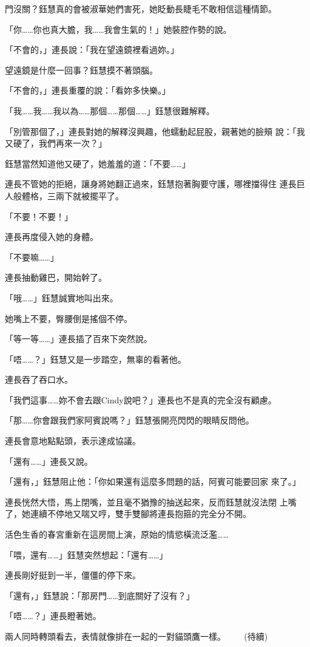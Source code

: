 門沒關？鈺慧真的會被淑華她們害死，她眨動長睫毛不敢相信這種情節。

「你……你也真大膽，我……我會生氣的！」她裝腔作勢的說。

「不會的，」連長說：「我在望遠鏡裡看過妳。」

望遠鏡是什麼一回事？鈺慧摸不著頭腦。

「不會的，」連長重覆的說：「看妳多快樂。」

「我……我……我以為……那個……那個……」鈺慧很難解釋。

「別管那個了，」連長對她的解釋沒興趣，他蠕動起屁股，親著她的臉頰
說：「我又硬了，我們再來一次？」

鈺慧當然知道他又硬了，她羞羞的道：「不要……」

連長不管她的拒絕，讓身將她翻正過來，鈺慧抱著胸要守護，哪裡擋得住
連長巨人般體格，三兩下就被擺平了。

「不要！不要！」

連長再度侵入她的身體。

「不要嘛……」

連長抽動雞巴，開始幹了。

「哦……」鈺慧誠實地叫出來。

她嘴上不要，臀腰倒是搖個不停。

「等一等……」連長插了百來下突然說。

「唔……？」鈺慧又是一步踏空，無辜的看著他。

連長吞了吞口水。

「我們這事……妳不會去跟Cindy說吧？」連長也不是真的完全沒有顧慮。

「那……你會跟我們家阿賓說嗎？」鈺慧張開亮閃閃的眼睛反問他。

連長會意地點點頭，表示達成協議。

「還有……」連長又說。

「還有，」鈺慧阻止他：「你如果還有這麼多問題的話，阿賓可能要回家
來了。」

連長恍然大悟，馬上閉嘴，並且毫不猶豫的抽送起來，反而鈺慧就沒法閉
上嘴了，她連續不停地又喘又哼，雙手雙腳將連長抱箍的完全分不開。

活色生香的春宮重新在這房間上演，原始的情慾橫流泛濫……

「喂，還有……」鈺慧突然想起：「還有……」

連長剛好挺到一半，僵僵的停下來。

「還有，」鈺慧說：「那房門……到底關好了沒有？」

「唔……？」連長瞪著她。

兩人同時轉頭看去，表情就像排在一起的一對貓頭鷹一樣。　
　
(待續)










